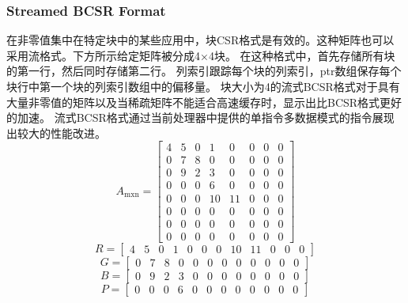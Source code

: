 \documentclass[forprint]{WHUBachelor}
\begin{document}
\subsubsection{Streamed BCSR Format}
在非零值集中在特定块中的某些应用中，块CSR格式是有效的。这种矩阵也可以采用流格式。下方所示给定矩阵被分成4×4块。 在这种格式中，首先存储所有块的第一行，然后同时存储第二行。 列索引跟踪每个块的列索引，ptr数组保存每个块行中第一个块的列索引数组中的偏移量。 块大小为4的流式BCSR格式对于具有大量非零值的矩阵以及当稀疏矩阵不能适合高速缓存时，显示出比BCSR格式更好的加速。 流式BCSR格式通过当前处理器中提供的单指令多数据模式的指令展现出较大的性能改进。
\begin{equation} 
A_{\operatorname{mxn}}=\left[ \begin{array}{cccccccc}{4} & {5} & {0} & {1} & {0} & {0} & {0} & {0} \\ {0} & {7} & {8} & {0} & {0} & {0} & {0} & {0} \\ {0} & {9} & {2} & {3} & {0} & {0} & {0} & {0} \\ {0} & {0} & {0} & {6} & {0} & {0} & {0} & {0} \\ {0} & {0} & {0} & {10} & {11} & {0} & {0} & {0} \\ {0} & {0} & {0} & {0} & {0} & {0} & {0} & {0} \\ {0} & {0} & {0} & {0} & {0} & {0} & {0} & {0} \\ {0} & {0} & {0} & {0} & {0} & {0} & {0} & {0}\end{array}\right]
 \end{equation}
\begin{equation} 
R=\left[ \begin{array}{llllllllllll}{4} & {5} & {0} & {1} & {0} & {0} & {0} & {10} & {11} & {0} & {0} & {0}\end{array}\right]
 \end{equation}
\begin{equation} 
G=\left[ \begin{array}{llllllllllll}{0} & {7} & {8} & {0} & {0} & {0} & {0} & {0} & {0} & {0} & {0} & {0}\end{array}\right]
 \end{equation}
\begin{equation} 
B=\left[ \begin{array}{llllllllllll}{0} & {9} & {2} & {3} & {0} & {0} & {0} & {0} & {0} & {0} & {0} & {0}\end{array}\right]
 \end{equation}
\begin{equation} 
P=\left[ \begin{array}{cccccccccccc}{0} & {0} & {0} & {6} & {0} & {0} & {0} & {0} & {0} & {0} & {0} & {0}\end{array}\right]
 \end{equation}
\end{document}
